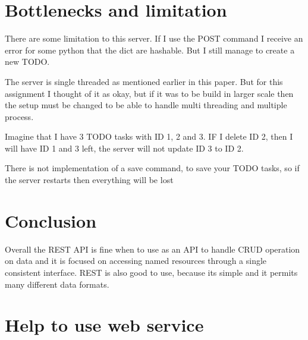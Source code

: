 \documentclass{sig-alternate-05-2015}
\begin{document}
\section{Bottlenecks and limitation}
There are some limitation to this server. If I use the POST command I receive an error for some python that the dict are hashable. But I still manage to create a new TODO. 

The server is single threaded as mentioned earlier in this paper. But for this assignment I thought of it as okay, but if it was to be build in larger scale then the setup must be changed to be able to handle multi threading and multiple process.

Imagine that I have 3 TODO tasks with ID 1, 2 and 3. IF I delete ID 2, then I will have ID 1 and 3 left, the server will not update ID 3 to ID 2.

There is not implementation of a save command, to save your TODO tasks, so if the server restarts then everything will be lost

\section{Conclusion}
Overall the REST API is fine when to use as an API to handle CRUD operation on data and it is focused on accessing named resources through a single consistent interface.
REST is also good to use, because its simple and it permits many different data formats.

\newpage
\onecolumn
\appendix
\section{Help to use web service}
\end{document}
